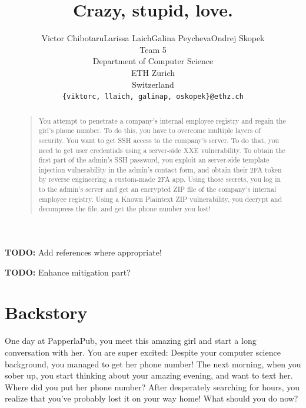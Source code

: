 \documentclass[a4paper]{article}
\newcommand{\TODO}[1]{\begin{center}\large\textbf{TODO:} #1\end{center}}
\begin{document}
%
\title{Crazy, stupid, love.}
\author{Victor Chibotaru\quad Larissa Laich\quad Galina Peycheva\quad Ondrej Skopek\\
  Team 5\\
  Department of Computer Science\\
  ETH Zurich\\
  Switzerland\\
  \texttt{\{viktorc, llaich, galinap, oskopek\}@ethz.ch}
}
\maketitle
\begin{abstract}
  \begin{quote}
    You attempt to penetrate a company's internal employee registry and
    regain the girl's phone number. To do this, you have to overcome
    multiple layers of security. You want to get SSH access to the company's
    server. To do that, you need to get user credentials using a
    server-side XXE vulnerability.
    To obtain the first part of the admin's SSH password, you
    exploit an server-side template injection vulnerability in the
    admin's contact form, and obtain their 2FA token by
    reverse engineering a custom-made 2FA app.
    Using those secrets, you log in to the admin's server
    and get an encrypted ZIP file of the company's internal employee
    registry. Using a Known Plaintext ZIP vulnerability, you
    decrypt and decompress the file, and get the phone number you lost!
  \end{quote}
\end{abstract}

\TODO{Add references where appropriate!}
\TODO{Enhance mitigation part?}

\section{Backstory}

One day at PapperlaPub, you meet this amazing girl and start a long
conversation with her. You are super excited: Despite your computer
science background, you managed to get her phone number! The next
morning, when you sober up, you start thinking about your amazing
evening, and want to text her. Where did you put her phone number? After
desperately searching for hours, you realize that you've
probably lost it on your way home! What should you do now?
\end{document}
